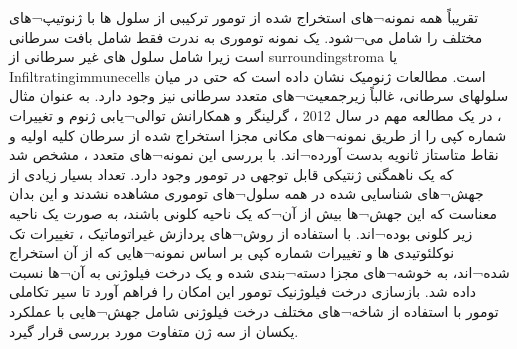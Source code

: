 تقریباً همه نمونه¬های استخراج شده از تومور ترکیبی از سلول ها با ژنوتیپ¬های مختلف را شامل می¬شود. یک نمونه توموری به ندرت فقط شامل بافت سرطانی است زیرا شامل سلول های غیر سرطانی از \gls{surroundingstroma}  یا \glspl{Infiltratingimmunecell}  است. مطالعات ژنومیک نشان داده است که حتی در میان سلولهای سرطانی، غالباً زیرجمعیت¬های متعدد سرطانی نیز وجود دارد. به عنوان مثال ، در یک مطالعه مهم در سال 2012 ، گرلینگر و همکارانش \cite{gerlinger2012intratumor} توالی¬یابی ژنوم و تغییرات شماره کپی را از طریق نمونه¬های مکانی مجزا استخراج شده از سرطان کلیه اولیه و نقاط متاستاز ثانویه بدست آورده¬اند. با بررسی  این نمونه¬های متعدد ، مشخص شد که یک ناهمگنی ژنتیکی قابل توجهی در تومور وجود دارد. تعداد بسیار زیادی از جهش¬های شناسایی شده در همه سلول¬های توموری مشاهده نشدند و این بدان معناست که این جهش¬ها بیش از آن¬که یک ناحیه کلونی باشند، به صورت یک ناحیه زیر کلونی بوده¬اند. با استفاده از روش¬های پردازش غیراتوماتیک ، تغییرات تک نوکلئوتیدی  ها و تغییرات شماره کپی بر اساس نمونه¬هایی که از آن استخراج شده¬اند، به خوشه¬های مجزا دسته¬بندی شده و یک درخت فیلوژنی به آن¬ها نسبت داده شد. بازسازی درخت فیلوژنیک تومور این امکان را فراهم آورد تا سیر تکاملی تومور با استفاده از شاخه¬های مختلف درخت فیلوژنی شامل جهش¬هایی با عملکرد یکسان از سه ژن متفاوت مورد بررسی قرار گیرد. 


